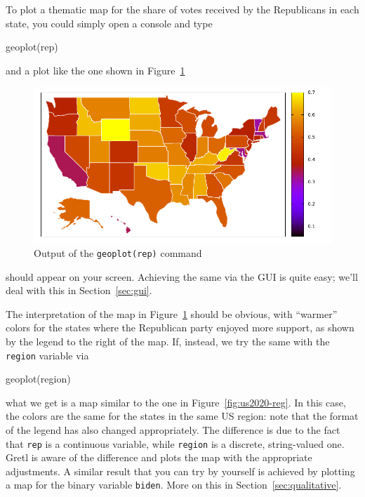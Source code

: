 \documentclass{article}
\begin{document}
To plot a thematic map for the share of votes received by the
Republicans in each state, you could simply open a console and type
\begin{code}
geoplot(rep)
\end{code}
and a plot like the one shown in Figure~\ref{fig:us2020-rep}
\begin{figure}[htbp]
  \centering
  \includegraphics[scale=0.75]{us2020-rep}
  \caption{Output of the \texttt{geoplot(rep)} command}
  \label{fig:us2020-rep}
\end{figure}
should appear on your screen. Achieving the same via the GUI is quite
easy; we'll deal with this in Section~\ref{sec:gui}.

The interpretation of the map in Figure~\ref{fig:us2020-rep} should be
obvious, with ``warmer'' colors for the states where the Republican
party enjoyed more support, as shown by the legend to the right of the
map. If, instead, we try the same with the \texttt{region} variable
via
\begin{code}
  geoplot(region)
\end{code}
what we get is a map similar to the one in
Figure~\ref{fig:us2020-reg}. In this case, the colors are the same for
the states in the same US region: note that the format of the legend
has also changed appropriately. The difference is due to the fact that
\texttt{rep} is a continuous variable, while \texttt{region} is a
discrete, string-valued one. Gretl is aware of the difference and
plots the map with the appropriate adjustments. A similar result that
you can try by yourself is achieved by plotting a map for the binary
variable \texttt{biden}. More on this in
Section~\ref{sec:qualitative}.
\end{document}
